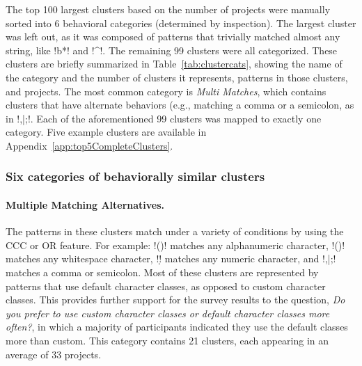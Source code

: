 

The top 100 largest clusters based on the number of projects were manually sorted into 6 behavioral categories (determined by inspection).  The largest cluster was left out, as it was composed of patterns that trivially matched almost any string, like \cverb!b*! and \cverb!^!.  The remaining 99 clusters were all categorized. These clusters are briefly summarized in Table~\ref{tab:clustercats}, showing the name of the category and the number of clusters it represents, patterns in those clusters, and projects. The most common category is \emph{Multi Matches}, which contains clusters that have alternate behaviors (e.g., matching a comma or a semicolon, as in \cverb!,|;!. Each of the aforementioned 99 clusters was mapped to exactly one category.  Five example clusters are available in Appendix~\ref{app:top5CompleteClusters}.


\subsubsection{Six categories of behaviorally similar clusters}
\label{sec:categoriesDefined}
\paragraph{Multiple Matching Alternatives.}
The patterns in these clusters match under a variety of conditions by using the CCC or OR feature.  For example: \cverb!(\W)! matches any alphanumeric character, \cverb!(\s)! matches any whitespace character, \cverb!\d! matches any numeric character, and \cverb!,|;! matches a comma or semicolon.  Most of these clusters are represented by patterns that use default character classes, as opposed to custom character classes.  This provides further support for the survey results to the question, \emph{Do you prefer to use custom character classes or default character classes more often?}, in which a majority of participants indicated they use the default classes more than custom.
This category contains 21 clusters, each appearing in an average of 33 projects.

